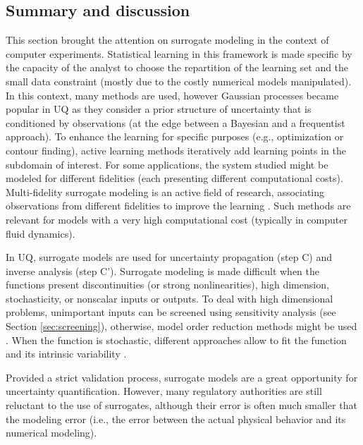 \subsection{Summary and discussion}

This section brought the attention on surrogate modeling in the context of computer experiments. 
Statistical learning in this framework is made specific by the capacity of the analyst to choose the repartition of the learning set and the small data constraint (mostly due to the costly numerical models manipulated). 
In this context, many methods are used, however Gaussian processes became popular in UQ as they consider a prior structure of uncertainty that is conditioned by observations (at the edge between a Bayesian and a frequentist approach). 
To enhance the learning for specific purposes (e.g., optimization or contour finding), active learning methods iteratively add learning points in the subdomain of interest. 
For some applications, the system studied might be modeled for different fidelities (each presenting different computational costs). 
Multi-fidelity surrogate modeling is an active field of research, associating observations from different fidelities to improve the learning \citep{fernandez_2016_review_multifi}. 
Such methods are relevant for models with a very high computational cost (typically in computer fluid dynamics).  

In UQ, surrogate models are used for uncertainty propagation (step C) and inverse analysis (step C'). 
Surrogate modeling is made difficult when the functions present discontinuities (or strong nonlinearities), high dimension, stochasticity, or nonscalar inputs or outputs. 
To deal with high dimensional problems, unimportant inputs can be screened using sensitivity analysis (see Section \ref{sec:screening}), otherwise, model order reduction methods might be used . 
When the function is stochastic, different approaches allow to fit the function and its intrinsic variability \citep{binois_2019_replication,baker_2020_stochastic_surrogates_review,zhu_2023_stochastic_pce}. 

Provided a strict validation process, surrogate models are a great opportunity for uncertainty quantification. 
However, many regulatory authorities are still reluctant to the use of surrogates, although their error is often much smaller that the modeling error (i.e., the error between the actual physical behavior and its numerical modeling). 


